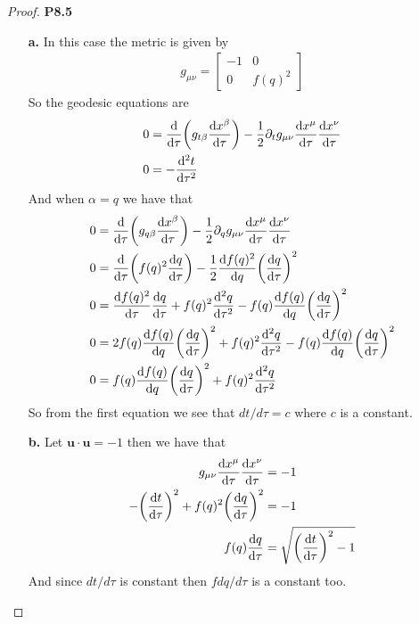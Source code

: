 \documentclass[11pt]{article}
\theoremstyle{definition}
\begin{document}
\begin{proof}{\textbf{P8.5}}
    \begin{itemize}
        \item [\textbf{a.}] In this case the metric is given by
        \begin{align*}
            g_{\mu\nu} = \begin{bmatrix}
                -1 & 0 \\
                0 & f(q)^2
            \end{bmatrix}
        \end{align*}
        So the geodesic equations are
        \begin{align*}
            0 &= \derivative{}{\tau}\bigg(
            g_{t\beta}\derivative{x^\beta}{\tau}\bigg)
            - \frac{1}{2}\partial_t g_{\mu\nu}\derivative{x^\mu}{\tau}
            \derivative{x^\nu}{\tau}\\
            0 &= -\derivative[2]{t}{\tau}
        \end{align*}
        And when $\alpha = q$ we have that
        \begin{align*}
            0 &= \derivative{}{\tau}\bigg(
            g_{q\beta}\derivative{x^\beta}{\tau}\bigg)
            - \frac{1}{2}\partial_q g_{\mu\nu}\derivative{x^\mu}{\tau}
            \derivative{x^\nu}{\tau}\\
            0 &= \derivative{}{\tau}\bigg(
            f(q)^2\derivative{q}{\tau}\bigg)
            - \frac{1}{2}\derivative{f(q)^2}{q}\bigg(\derivative{q}{\tau}\bigg)^2\\
            0 &= \derivative{f(q)^2}{\tau}\derivative{q}{\tau}
            + f(q)^2\derivative[2]{q}{\tau}
            - f(q)\derivative{f(q)}{q}\bigg(\derivative{q}{\tau}\bigg)^2\\
            0 &= 2f(q)\derivative{f(q)}{q}\bigg(\derivative{q}{\tau}\bigg)^2
            + f(q)^2\derivative[2]{q}{\tau}
            - f(q)\derivative{f(q)}{q}\bigg(\derivative{q}{\tau}\bigg)^2\\
            0 &= f(q)\derivative{f(q)}{q}\bigg(\derivative{q}{\tau}\bigg)^2
            + f(q)^2\derivative[2]{q}{\tau}
        \end{align*}
        So from the first equation we see that $dt/d\tau = c$ where $c$ is
        a constant.

        \item[\textbf{b.}] Let $\bm{u}\cdot\bm{u} = -1$ then we have that
        \begin{align*}
            g_{\mu\nu}\derivative{x^\mu}{\tau}\derivative{x^\nu}{\tau} &= -1\\
            -\bigg(\derivative{t}{\tau}\bigg)^2
            + f(q)^2\bigg(\derivative{q}{\tau}\bigg)^2 &= -1\\
            f(q)\derivative{q}{\tau}
            &= \sqrt{\bigg(\derivative{t}{\tau}\bigg)^2 - 1}
        \end{align*}
        And since $dt/d\tau$ is constant then $fdq/d\tau$ is a constant too.


\end{itemize}
\end{proof}
\end{document}
